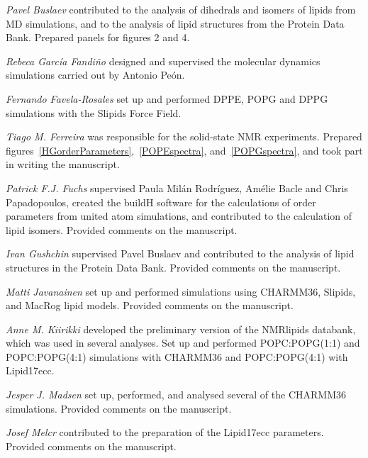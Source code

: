 \documentclass[journal=jpcbfk]{achemso}
\begin{document}
\noindent
{\it Pavel Buslaev}
contributed to the analysis of dihedrals and isomers of lipids from MD simulations, and to the analysis of lipid structures from the Protein Data Bank. Prepared panels for figures 2 and 4. 

\noindent
{\it Rebeca Garc{\'i}a Fandi{\~n}o}
designed and supervised the molecular dynamics simulations carried out by Antonio Pe{\'o}n.

\noindent
{\it Fernando Favela-Rosales} 
set up and performed DPPE, POPG and DPPG simulations with the Slipids Force Field.

\noindent
{\it Tiago M. Ferreira}
was responsible for the solid-state NMR experiments. Prepared figures~\ref{HGorderParameters},~\ref{POPEspectra}, and~\ref{POPGspectra}, and took part in writing the manuscript.

\noindent
{\it Patrick F.J. Fuchs} supervised Paula Mil{\'a}n Rodr{\'i}guez, Am{\'e}lie Bacle and Chris Papadopoulos,
created the buildH software for the calculations of order parameters
from united atom simulations,
and contributed to the calculation of lipid isomers. Provided comments on the manuscript.

\noindent
{\it Ivan Gushchin} supervised Pavel Buslaev and contributed to the analysis of lipid structures in the Protein Data Bank. Provided comments on the manuscript.

\noindent
{\it Matti Javanainen} set up and performed simulations using CHARMM36, Slipids, and MacRog lipid models. Provided comments on the manuscript.

\noindent
{\it Anne M. Kiirikki} developed the preliminary version of the NMRlipids databank, which was used in several analyses. Set up and performed POPC:POPG(1:1) and POPC:POPG(4:1) simulations with CHARMM36 and POPC:POPG(4:1) with Lipid17ecc.

\noindent
{\it Jesper J. Madsen}
set up, performed, and analysed several of the CHARMM36 simulations.
Provided comments on the manuscript.

\noindent
{\it Josef Melcr}
contributed to the preparation of the Lipid17ecc parameters. 
Provided comments on the manuscript.
\end{document}
